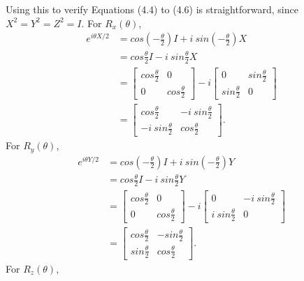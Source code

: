 Using this to verify Equations (4.4) to (4.6) is straightforward,
since $X^2 = Y^2 = Z^2 = I$.
For $R_x(\theta)$,
\begin{align}
    e^{i \theta X / 2} &= cos( - \frac \theta 2) I + i\ sin( - \frac \theta 2) X \\
    &= cos \frac \theta 2 I - i\ sin \frac \theta 2 X \\
    &= \left[ \begin{matrix} cos \frac \theta 2 & 0 \\ 0 & cos \frac \theta 2 \end{matrix} \right] - i
        \left[ \begin{matrix} 0 & sin \frac \theta 2 \\ sin \frac \theta 2 & 0 \end{matrix} \right] \\
    &= \left[ \begin{matrix} cos \frac \theta 2 & - i\ sin \frac \theta 2 \\
        - i\ sin \frac \theta 2 & cos \frac \theta 2 \end{matrix} \right].
\end{align}
For $R_y(\theta)$,
\begin{align}
    e^{i \theta Y / 2} &= cos( - \frac \theta 2) I + i\ sin( - \frac \theta 2) Y \\
    &= cos \frac \theta 2 I - i\ sin \frac \theta 2 Y \\
    &= \left[ \begin{matrix} cos \frac \theta 2 & 0 \\ 0 & cos \frac \theta 2 \end{matrix} \right] - i
        \left[ \begin{matrix} 0 & -i\ sin \frac \theta 2 \\ i\ sin \frac \theta 2 & 0 \end{matrix} \right] \\
    &= \left[ \begin{matrix} cos \frac \theta 2 & - sin \frac \theta 2 \\
        sin \frac \theta 2 & cos \frac \theta 2 \end{matrix} \right].
\end{align}
For $R_z(\theta)$,
